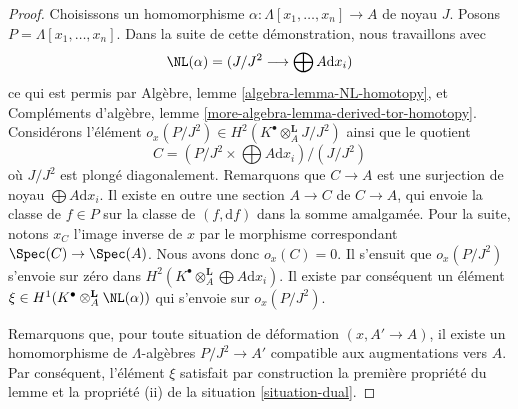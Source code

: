 \begin{proof}
Choisissons un homomorphisme $\alpha : \Lambda[x_1, \ldots, x_n] \to A$ de noyau $J$.
Posons $P = \Lambda[x_1, \ldots, x_n]$. Dans la suite de cette démonstration, nous travaillons avec
$$
\NL(\alpha) = (J/J^2 \longrightarrow \bigoplus A \text{d}x_i)
$$
ce qui est permis par
Algèbre, lemme \ref{algebra-lemma-NL-homotopy},
et
Compléments d'algèbre, lemme \ref{more-algebra-lemma-derived-tor-homotopy}.
Considérons l'élément
$o_x(P/J^2) \in H^2(K^\bullet \otimes_A^\mathbf{L} J/J^2)$ ainsi que
le quotient
$$
C = (P/J^2 \times \bigoplus A \text{d}x_i)/(J/J^2)
$$
où $J/J^2$ est plongé diagonalement. Remarquons que $C \to A$ est une surjection
de noyau $\bigoplus A\text{d}x_i$. Il existe en outre une section
$A \to C$ de $C \to A$, qui envoie la classe de $f \in P$ sur la classe
de $(f, \text{d}f)$ dans la somme amalgamée. Pour la suite, notons $x_C$
l'image inverse de $x$ par le morphisme correspondant $\Spec(C) \to \Spec(A)$.
Nous avons donc $o_x(C) = 0$.
Il s'ensuit que $o_x(P/J^2)$ s'envoie sur zéro dans
$H^2(K^\bullet \otimes_A^\mathbf{L} \bigoplus A\text{d}x_i)$.
Il existe par conséquent un élément
$\xi \in H^1(K^\bullet \otimes_A^\mathbf{L} \NL(\alpha))$
qui s'envoie sur $o_x(P/J^2)$.

\medskip\noindent
Remarquons que, pour toute situation de déformation $(x, A' \to A)$, il existe
un homomorphisme de $\Lambda$-algèbres $P/J^2 \to A'$ compatible aux augmentations
vers $A$. Par conséquent, l'élément
$\xi$ satisfait par construction la première propriété du lemme
et la propriété (ii) de la situation \ref{situation-dual}.


\end{proof}
